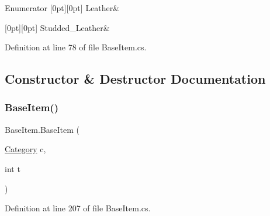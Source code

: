 \begin{DoxyEnumFields}{Enumerator}
[0pt][0pt]{}\mbox{\label{class_base_item_a920c9e47e5258c5bac64842ce8997cb0abdf7ad23e89b55f904bca0304819309e}} 
Leather&\\
\hline

[0pt][0pt]{}\mbox{\label{class_base_item_a920c9e47e5258c5bac64842ce8997cb0a34833b9352f8ebeef7960b067a6ee001}} 
Studded\+\_\+\+Leather&\\
\hline

\end{DoxyEnumFields}


Definition at line 78 of file Base\+Item.\+cs.



\subsection{Constructor \& Destructor Documentation}
\mbox{\label{class_base_item_a77ce3304ad35c5fdb9ed807beac19a66}} 
\subsubsection{\texorpdfstring{BaseItem()}{BaseItem()}\hspace{0.1cm}{\footnotesize\ttfamily [1/2]}}
{\footnotesize\ttfamily Base\+Item.\+Base\+Item (\begin{DoxyParamCaption}\item[{\mbox{\hyperlink{class_base_item_a882a2962396f880c2e23755437245d37}{Category}}}]{c,  }\item[{int}]{t }\end{DoxyParamCaption})}



Definition at line 207 of file Base\+Item.\+cs.

\mbox{\label{class_base_item_a4faa2410aa193b87718cc3ed337c0766}} 
